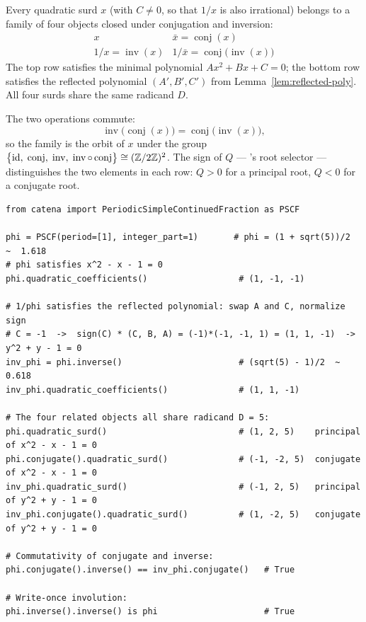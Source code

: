 \begin{remark}
  \label{rem:four-surds}
  Every quadratic surd $x$ (with $C \neq 0$, so that $1/x$ is also irrational) belongs
  to a family of four objects closed under conjugation and inversion:
  \[
    \begin{array}{ll}
      x                               & \bar{x} = \operatorname{conj}(x) \\[4pt]
      1/x = \operatorname{inv}(x) & 1/\bar{x} = \operatorname{conj}\!\bigl(\operatorname{inv}(x)\bigr)
    \end{array}
  \]
  The top row satisfies the minimal polynomial $Ax^2 + Bx + C = 0$; the bottom row
  satisfies the reflected polynomial $(A', B', C')$ from Lemma~\ref{lem:reflected-poly}.
  All four surds share the same radicand $D$.

  The two operations commute:
  \[
    \operatorname{inv}\!\bigl(\operatorname{conj}(x)\bigr)
    = \operatorname{conj}\!\bigl(\operatorname{inv}(x)\bigr),
  \]
  so the family is the orbit of $x$ under the group
  $\bigl\{\mathrm{id},\;\operatorname{conj},\;\operatorname{inv},\;
  \operatorname{inv}\circ\operatorname{conj}\bigr\} \cong (\mathbb{Z}/2\mathbb{Z})^2$.
  The sign of $Q$ — \catena's root selector — distinguishes the two elements in
  each row: $Q > 0$ for a principal root, $Q < 0$ for a conjugate root.
\end{remark}

\begin{catenadef}
\begin{lstlisting}[style=python]
from catena import PeriodicSimpleContinuedFraction as PSCF

phi = PSCF(period=[1], integer_part=1)       # phi = (1 + sqrt(5))/2  ~  1.618
# phi satisfies x^2 - x - 1 = 0
phi.quadratic_coefficients()                  # (1, -1, -1)

# 1/phi satisfies the reflected polynomial: swap A and C, normalize sign
# C = -1  ->  sign(C) * (C, B, A) = (-1)*(-1, -1, 1) = (1, 1, -1)  ->  y^2 + y - 1 = 0
inv_phi = phi.inverse()                       # (sqrt(5) - 1)/2  ~  0.618
inv_phi.quadratic_coefficients()              # (1, 1, -1)

# The four related objects all share radicand D = 5:
phi.quadratic_surd()                          # (1, 2, 5)    principal of x^2 - x - 1 = 0
phi.conjugate().quadratic_surd()              # (-1, -2, 5)  conjugate of x^2 - x - 1 = 0
inv_phi.quadratic_surd()                      # (-1, 2, 5)   principal of y^2 + y - 1 = 0
inv_phi.conjugate().quadratic_surd()          # (1, -2, 5)   conjugate of y^2 + y - 1 = 0

# Commutativity of conjugate and inverse:
phi.conjugate().inverse() == inv_phi.conjugate()   # True

# Write-once involution:
phi.inverse().inverse() is phi                     # True
\end{lstlisting}
\end{catenadef}

